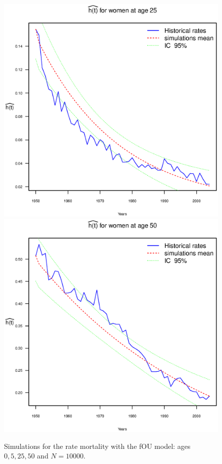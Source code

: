 \documentclass[smallextended]{svjour3}
\begin{document}
\begin{figure}[H]
    \includegraphics{PlotWomen25.eps}
    \includegraphics{PlotWomen50.eps}
    \caption{Simulations for the rate mortality with the fOU model: ages
    $0,5,25,50$ and $N=10000$.}
    \label{graph-simu_FOU1}
\end{figure}
\end{document}

